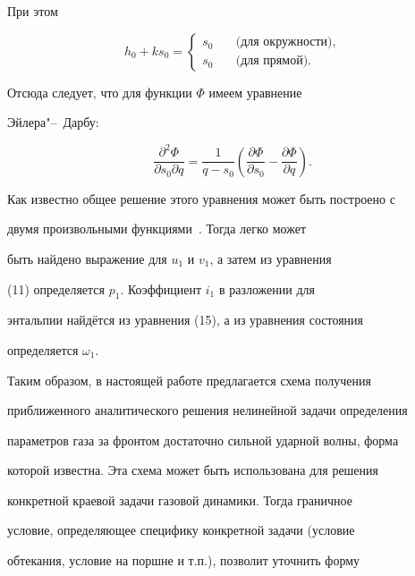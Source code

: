 При этом


\[


 h_0 + k s_0 =


\begin{cases}


s_0  \quad & \mbox{(для окружности)},  \\


s_0 \quad & \mbox{(для прямой)}.


\end{cases}


 \]


Отсюда следует,  что для функции $\Phi$ имеем уравнение


Эйлера"--~Дарбу:


\[


\frac{{\partial}^2 \Phi}{\partial s_0 \partial


q} = \frac{1}{q - s_0}\left(\frac{\partial \Phi}{\partial


s_0} - \frac{\partial \Phi}{\partial q}\right).


\]





Как известно общее решение этого уравнения может быть построено с


двумя произвольными функциями~\cite{Trikomi}. Тогда легко может


быть найдено выражение для $u_1$ и $v_1$,  а затем из уравнения


(11) определяется $p_1$. Коэффициент $i_1$ в разложении для


энтальпии найдётся из уравнения (15),  а из уравнения состояния


определяется $\omega_1$.





Таким образом, в настоящей работе предлагается схема получения


приближенного аналитического решения нелинейной задачи определения


параметров газа за фронтом достаточно сильной ударной волны,  форма


которой известна. Эта схема может быть использована для решения


конкретной краевой задачи газовой динамики. Тогда граничное


условие,  определяющее специфику конкретной задачи (условие


обтекания,  условие на поршне и т.п.),  позволит уточнить форму


